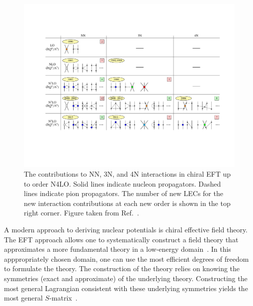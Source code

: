 \begin{figure}[t!]
  \centering
  \includegraphics[width=1.0\textwidth]{proposal/doc/images/external/table_norefs.pdf}
  \caption[
    The contributions to NN, 3N, and 4N interactions in chiral EFT
    up to order N4LO.\@
    Solid lines indicate nucleon propagators.
    Dashed lines indicate pion propagators.
    The number of new LECs for the new interaction contributions at each new order
    is shown in the top right corner.
  ]{
    The contributions to NN, 3N, and 4N interactions in chiral EFT
    up to order N4LO.\@
    Solid lines indicate nucleon propagators.
    Dashed lines indicate pion propagators.
    The number of new LECs for the new interaction contributions at each new order
    is shown in the top right corner.
    Figure taken from Ref.~\cite{Hebe20habi}.
  }\label{fig:chiefttable}
\end{figure}

A modern approach to deriving nuclear potentials is chiral effective field theory.
The EFT approach allows one to systematically construct a field theory that approximates
a more fundamental theory in a low-energy domain~\cite{Epel08chiraleft,Mach11chiraleft,Hamm19nuceftreview}.
In this apppropriately chosen domain,
one can use the most efficient degrees of freedom to formulate the theory.
The construction of the theory relies on knowing the symmetries (exact and approximate) of the underlying theory.
Constructing the most general Lagrangian consistent with these underlying symmetries
yields the most general $S$-matrix~\cite{Wein78eft}.

